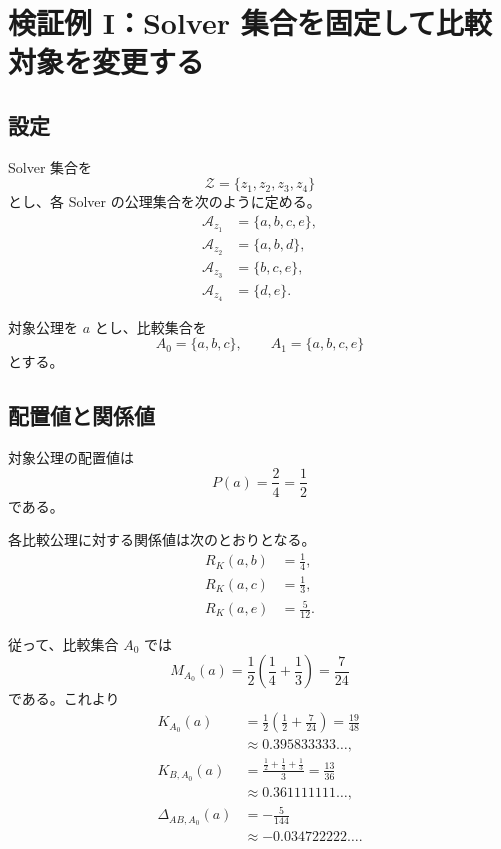\documentclass[a4paper,11pt]{ltjsarticle}
\begin{document}
\section{検証例 I：Solver 集合を固定して比較対象を変更する}

\subsection{設定}

Solver 集合を
\begin{equation}
  \mathcal{Z}=\{z_1,z_2,z_3,z_4\}
\end{equation}
とし、各 Solver の公理集合を次のように定める。
\begin{align}
  \mathcal{A}_{z_1}&=\{a,b,c,e\},\\
  \mathcal{A}_{z_2}&=\{a,b,d\},\\
  \mathcal{A}_{z_3}&=\{b,c,e\},\\
  \mathcal{A}_{z_4}&=\{d,e\}.
\end{align}

対象公理を $a$ とし、比較集合を
\begin{equation}
  A_0=\{a,b,c\},\qquad
  A_1=\{a,b,c,e\}
\end{equation}
とする。

\subsection{配置値と関係値}

対象公理の配置値は
\begin{equation}
  P(a)=\frac24=\frac12
\end{equation}
である。

各比較公理に対する関係値は次のとおりとなる。
\begin{align}
  R_K(a,b)&=\frac14,\\
  R_K(a,c)&=\frac13,\\
  R_K(a,e)&=\frac5{12}.
\end{align}

従って、比較集合 $A_0$ では
\begin{equation}
  M_{A_0}(a)
  =
  \frac12\left(\frac14+\frac13\right)
  =\frac7{24}
\end{equation}
である。これより
\begin{align}
  K_{A_0}(a)
  &=\frac12\left(\frac12+\frac7{24}\right)
    =\frac{19}{48}\\
  &\approx0.395833333\ldots,\\
  K_{B,A_0}(a)
  &=\frac{\frac12+\frac14+\frac13}{3}
    =\frac{13}{36}\\
  &\approx0.361111111\ldots,\\
  \Delta_{AB,A_0}(a)
  &=-\frac5{144}\\
  &\approx-0.034722222\ldots.
\end{align}
\end{document}

